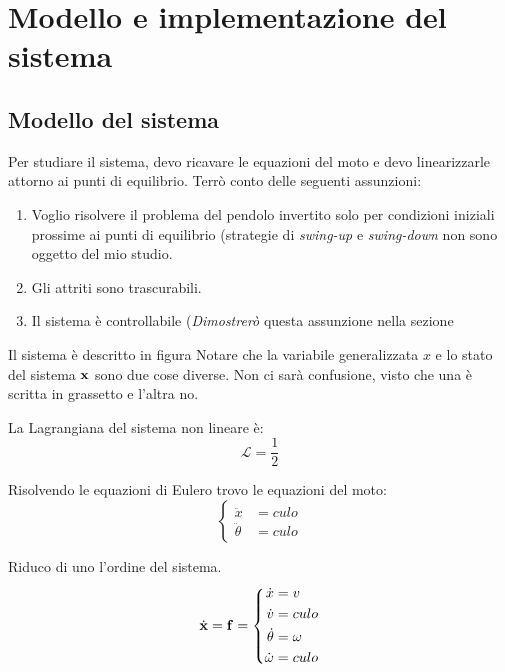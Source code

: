 \section{Modello e implementazione del sistema}\label{sec:modello}
\subsection{Modello del sistema}\label{subsec:modello-del-sistema}
Per studiare il sistema, devo ricavare le equazioni del moto e devo linearizzarle attorno ai punti di equilibrio.
Terrò conto delle seguenti assunzioni:

\begin{enumerate}
  \item%
  Voglio risolvere il problema del pendolo invertito solo per condizioni iniziali prossime ai punti di equilibrio
  (strategie di \emph{swing-up} e \emph{swing-down} non sono oggetto del mio studio.
  \item%
  Gli attriti sono trascurabili.
  \item%
  Il sistema è controllabile (\emph{Dimostrerò} questa assunzione nella sezione %
\end{enumerate}

Il sistema è descritto in figura %
Notare che la variabile generalizzata $x$ e lo stato del sistema $\bf x$ sono due cose diverse. Non ci sarà confusione,
visto che una è scritta in grassetto e l'altra no.

La Lagrangiana del sistema non lineare è:
\begin{equation}
  \mathcal L = \frac 1 2
  \label{eq:lagrangiana}
\end{equation}

Risolvendo le equazioni di Eulero trovo le equazioni del moto:
\begin{equation}
  \left\{
    \begin{aligned}
      \ddot x &= culo \\
      \ddot \theta &= culo
    \end{aligned}
  \right.
  \label{eq:eq-moto}
\end{equation}

Riduco di uno l'ordine del sistema.
\begin{equation}
  \dot {\bf x} = \bf f =
  \left\{
    \begin{aligned}
      \dot x &= v \\
      \dot v &= culo \\
      \dot \theta &= \omega \\
      \dot \omega &= culo
    \end{aligned}
  \right.
  \label{eq:eq-1-grado}
\end{equation}

